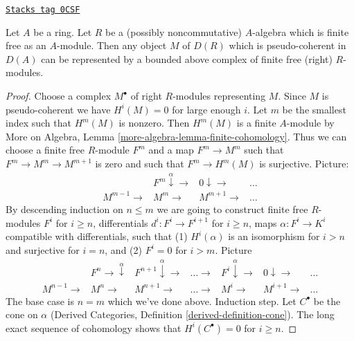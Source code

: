 \begin{lemma}
\label{perfect-lemma-pseudo-coherent-over-algebra}
\href{https://stacks.math.columbia.edu/tag/0CSF}{\texttt{Stacks tag 0CSF}}

Let $A$ be a ring. Let $R$ be a (possibly noncommutative) $A$-algebra
which is finite free as an $A$-module. Then any object $M$ of $D(R)$
which is pseudo-coherent in $D(A)$ can be represented by a
bounded above complex of finite free (right) $R$-modules.
\end{lemma}

\begin{proof}
Choose a complex $M^\bullet$ of right $R$-modules representing $M$.
Since $M$ is pseudo-coherent we have $H^i(M) = 0$ for large enough $i$.
Let $m$ be the smallest index such that $H^m(M)$ is nonzero.
Then $H^m(M)$ is a finite $A$-module by
More on Algebra, Lemma \ref{more-algebra-lemma-finite-cohomology}.
Thus we can choose a finite free $R$-module $F^m$ and a map
$F^m \to M^m$ such that $F^m \to M^m \to M^{m + 1}$ is zero
and such that $F^m \to H^m(M)$ is surjective.
Picture:
$$
\begin{array}{cccc} & F^m \overset{\alpha}{\downarrow}\longrightarrow & 0 \downarrow\longrightarrow & \ldots \\ M^{m - 1} \longrightarrow & M^m \longrightarrow & M^{m + 1} \longrightarrow & \ldots\end{array}
$$
By descending induction on $n \leq m$ we are going to construct
finite free $R$-modules $F^i$ for $i \geq n$, differentials
$d^i : F^i \to F^{i + 1}$ for $i \geq n$, maps $\alpha : F^i \to K^i$
compatible with differentials, such that
(1) $H^i(\alpha)$ is an isomorphism for $i > n$ and surjective for $i = n$, and
(2) $F^i = 0$ for $i > m$. Picture
$$
\begin{array}{ccccccc} & F^n \longrightarrow\overset{\alpha}{\downarrow} & F^{n + 1} \overset{\alpha}{\downarrow}\longrightarrow & \ldots \longrightarrow & F^i \overset{\alpha}{\downarrow}\longrightarrow & 0 \downarrow\longrightarrow & \ldots \\ M^{n - 1} \longrightarrow & M^n \longrightarrow & M^{n + 1} \longrightarrow & \ldots \longrightarrow & M^i \longrightarrow & M^{i + 1} \longrightarrow & \ldots\end{array}
$$
The base case is $n = m$ which we've done above.
Induction step. Let $C^\bullet$ be the cone on $\alpha$
(Derived Categories, Definition \ref{derived-definition-cone}).
The long exact sequence
of cohomology shows that $H^i(C^\bullet) = 0$ for $i \geq n$.

\end{proof}
